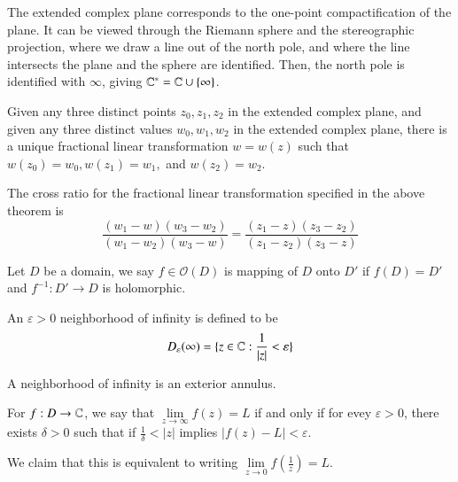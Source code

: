 The extended complex plane corresponds to the one-point compactification of the plane. It can be viewed through the Riemann sphere and the stereographic projection, where we draw a line out of the north pole, and where the line intersects the plane and the sphere are identified. Then, the north pole is identified with $\infty$, giving $\mathbb C^* = \mathbb C\cup\{\infty\}$.

\begin{theorem}
    Given any three distinct points $z_0,z_1,z_2$ in the extended complex plane, and given any three distinct values $w_0,w_1,w_2$ in the extended complex plane, there is a unique fractional linear transformation $w = w(z)$ such that $w(z_0) = w_0,w(z_1) = w_1,$ and $w(z_2) = w_2$.
\end{theorem}

\begin{definition}
    The cross ratio for the fractional linear transformation specified in the above theorem is \begin{equation*}
        \frac{(w_1 - w)(w_3 - w_2)}{(w_1 - w_2)(w_3 - w)} = \frac{(z_1-z)(z_3-z_2)}{(z_1-z_2)(z_3-z)}
    \end{equation*}
\end{definition}


\begin{definition}
    Let $D$ be a domain, we say $f \in \mathcal{O}(D)$ is  mapping of $D$ onto $D'$ if $f(D)  = D'$ and $f^{-1}:D'\rightarrow D$ is holomorphic.
\end{definition}

\begin{definition}
    An $\varepsilon > 0$ neighborhood of infinity is defined to be \begin{equation*}
        D_{\varepsilon}(\infty) = \{z \in \mathbb C:\frac{1}{|z|} < \varepsilon\}
    \end{equation*}
\end{definition}
A neighborhood of infinity is an exterior annulus.

\begin{definition}
    For $f:D\rightarrow \mathbb C$, we say that $\lim\limits_{z\rightarrow \infty}f(z) = L$ if and only if for evey $\varepsilon > 0$, there exists $\delta > 0$ such that if $\frac{1}{\delta} < |z|$ implies $|f(z) - L| < \varepsilon$.
\end{definition}

We claim that this is equivalent to writing $\lim\limits_{z\rightarrow 0}f\left(\frac{1}{z}\right) = L$. 

